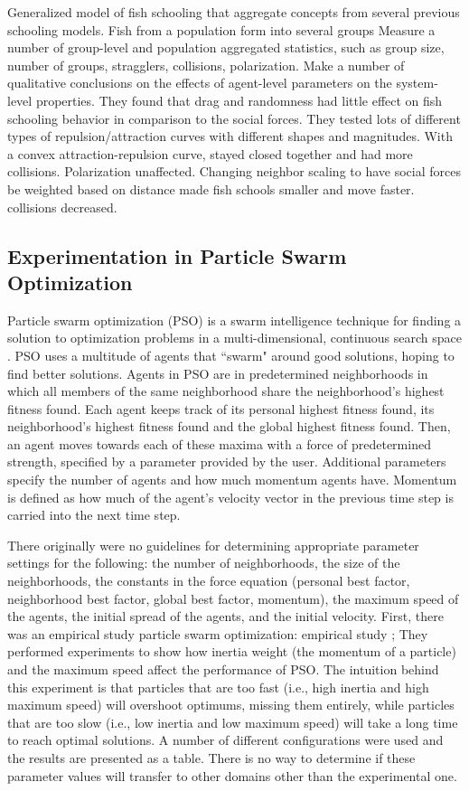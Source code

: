 \cite{parrish2002sof}
Generalized model of fish schooling that aggregate concepts from several previous schooling models.
Fish from a population form into several groups
Measure a number of group-level and population aggregated statistics, such as group size, number of groups, stragglers, collisions, polarization.
Make a number of qualitative conclusions on the effects of agent-level parameters on the system-level properties.
They found that drag and randomness had little effect on fish schooling behavior in comparison to the social forces.
They tested lots of different types of repulsion/attraction curves with different shapes and magnitudes.
With a convex attraction-repulsion curve, stayed closed together and had more collisions. Polarization unaffected.
Changing neighbor scaling to have social forces be weighted based on distance made fish schools smaller and move faster. collisions decreased.

\subsection{Experimentation in Particle Swarm Optimization}

Particle swarm optimization (PSO) is a swarm intelligence technique for finding a solution to optimization problems in a multi-dimensional, continuous search space \cite{kennedy1995pso}.
PSO uses a multitude of agents that ``swarm" around good solutions, hoping to find better solutions.
Agents in PSO are in predetermined neighborhoods in which all members of the same neighborhood share the neighborhood's highest fitness found.
Each agent keeps track of its personal highest fitness found, its neighborhood's highest fitness found and the global highest fitness found.
Then, an agent moves towards each of these maxima with a force of predetermined strength, specified by a parameter provided by the user.
Additional parameters specify the number of agents and how much momentum agents have.
Momentum is defined as how much of the agent's velocity vector in the previous time step is carried into the next time step.

There originally were no guidelines for determining appropriate parameter settings for the following: the number of neighborhoods, the size of the neighborhoods, the constants in the force equation (personal best factor, neighborhood best factor, global best factor, momentum), the maximum speed of the agents, the initial spread of the agents, and the initial velocity.
First, there was an empirical study particle swarm optimization: empirical study \cite{shi1998parameter};
They performed experiments to show how inertia weight (the momentum of a particle) and the maximum speed affect the performance of PSO.
The intuition behind this experiment is that particles that are too fast (i.e., high inertia and high maximum speed) will overshoot optimums, missing them entirely, while particles that are too slow (i.e., low inertia and low maximum speed) will take a long time to reach optimal solutions.
A number of different configurations were used and the results are presented as a table.
There is no way to determine if these parameter values will transfer to other domains other than the experimental one.

